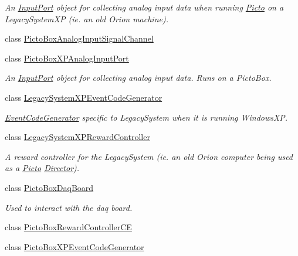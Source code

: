 \begin{DoxyCompactItemize}
\begin{DoxyCompactList}\small\item\em An \hyperlink{class_picto_1_1_input_port}{Input\-Port} object for collecting analog input data when running \hyperlink{namespace_picto}{Picto} on a Legacy\-System\-X\-P (ie. an old Orion machine). \end{DoxyCompactList}\item 
class \hyperlink{class_picto_1_1_picto_box_analog_input_signal_channel}{Picto\-Box\-Analog\-Input\-Signal\-Channel}
\item 
class \hyperlink{class_picto_1_1_picto_box_x_p_analog_input_port}{Picto\-Box\-X\-P\-Analog\-Input\-Port}
\begin{DoxyCompactList}\small\item\em An \hyperlink{class_picto_1_1_input_port}{Input\-Port} object for collecting analog input data. Runs on a Picto\-Box. \end{DoxyCompactList}\item 
class \hyperlink{class_picto_1_1_legacy_system_x_p_event_code_generator}{Legacy\-System\-X\-P\-Event\-Code\-Generator}
\begin{DoxyCompactList}\small\item\em \hyperlink{class_picto_1_1_event_code_generator}{Event\-Code\-Generator} specific to Legacy\-System when it is running Windows\-X\-P. \end{DoxyCompactList}\item 
class \hyperlink{class_picto_1_1_legacy_system_x_p_reward_controller}{Legacy\-System\-X\-P\-Reward\-Controller}
\begin{DoxyCompactList}\small\item\em A reward controller for the Legacy\-System (ie. an old Orion computer being used as a \hyperlink{namespace_picto}{Picto} \hyperlink{class_director}{Director}). \end{DoxyCompactList}\item 
class \hyperlink{class_picto_1_1_picto_box_daq_board}{Picto\-Box\-Daq\-Board}
\begin{DoxyCompactList}\small\item\em Used to interact with the daq board. \end{DoxyCompactList}\item 
class \hyperlink{class_picto_1_1_picto_box_reward_controller_c_e}{Picto\-Box\-Reward\-Controller\-C\-E}
\item 
class \hyperlink{class_picto_1_1_picto_box_x_p_event_code_generator}{Picto\-Box\-X\-P\-Event\-Code\-Generator}

\end{DoxyCompactItemize}
